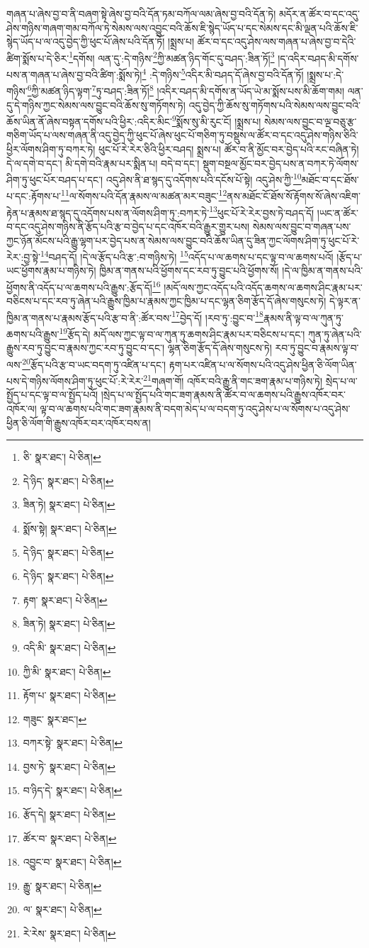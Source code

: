 གཞན་པ་ཞེས་བྱ་བ་ནི་བཞག་སྟེ་ཞེས་བྱ་བའི་དོན་ཏམ་བཀོལ་ལམ་ཞེས་བྱ་བའི་དོན་ཏེ། མདོར་ན་ཚོར་བ་དང་འདུ་ཤེས་གཉིས་གཞག་གམ་བཀོལ་ཏེ་སེམས་ལས་འབྱུང་བའི་ཆོས་ཇི་སྙེད་ཡོད་པ་དང་སེམས་དང་མི་ལྡན་པའི་ཆོས་ཇི་སྙེད་ཡོད་པ་ལ་འདུ་བྱེད་ཀྱི་ཕུང་པོ་ཞེས་པའི་དོན་ཏོ། །སྨྲས་པ། ཚོར་བ་དང་འདུ་ཤེས་ལས་གཞན་པ་ཞེས་བྱ་བ་དེའི་ཚིག་སྨོས་པ་དེ་ཅིར་\footnote{ཅི་  སྣར་ཐང་།  པེ་ཅིན། }དགོས། ལན་དུ་:དེ་གཉིས་\footnote{དེ་ཉིད་  སྣར་ཐང་།  པེ་ཅིན། }ཀྱི་མཚན་ཉིད་གོང་དུ་བཤད་:ཟིན་ཏོ།\footnote{ཟིན་ཏེ།  སྣར་ཐང་།  པེ་ཅིན། } །ད་འདིར་བཤད་མི་དགོས་པས་ན་གཞན་པ་ཞེས་བྱ་བའི་ཚིག་:སྨོས་ཏེ།\footnote{སྨོས་སྟེ།  སྣར་ཐང་།  པེ་ཅིན། } :དེ་གཉིས་\footnote{དེ་ཉིད་  སྣར་ཐང་།  པེ་ཅིན། }འདིར་མི་བཤད་དོ་ཞེས་བྱ་བའི་དོན་ཏོ། །སྨྲས་པ་:དེ་གཉིས་\footnote{དེ་ཉིད་  སྣར་ཐང་།  པེ་ཅིན། }ཀྱི་མཚན་ཉིད་ལྟག་\footnote{རྟག་  སྣར་ཐང་།  པེ་ཅིན། }ཏུ་བཤད་:ཟིན་ཏོ།\footnote{ཟིན་ཏེ།  སྣར་ཐང་།  པེ་ཅིན། } །འདིར་བཤད་མི་དགོས་ན་ཡོད་ཡེ་མ་སྨོས་པས་མི་ཆོག་གམ། ལན་དུ་དེ་གཉིས་ཀྱང་སེམས་ལས་བྱུང་བའི་ཆོས་སུ་གཏོགས་ཏེ། འདུ་བྱེད་ཀྱི་ཆོས་སུ་གཏོགས་པའི་སེམས་ལས་བྱུང་བའི་ཆོས་ཡིན་ནོ་ཞེས་བསྟན་དགོས་པའི་ཕྱིར་:འདིར་མིང་\footnote{འདི་མི་  སྣར་ཐང་།  པེ་ཅིན། }སྨོས་སུ་མི་རུང་ངོ། །སྨྲས་པ། སེམས་ལས་བྱུང་བ་ལྔ་བཅུ་རྩ་གཅིག་ཡོད་པ་ལས་གཞན་ནི་འདུ་བྱེད་ཀྱི་ཕུང་པོ་ཞེས་ཕུང་པོ་གཅིག་ཏུ་བསྡུས་ལ་ཚོར་བ་དང་འདུ་ཤེས་གཉིས་ཅིའི་ཕྱིར་ལོགས་ཤིག་ཏུ་བཀར་ཏེ། ཕུང་པོ་རེ་རེར་ཅིའི་ཕྱིར་བཤད། སྨྲས་པ། ཚོར་བ་ནི་མྱོང་བར་བྱེད་པའི་རང་བཞིན་ཏེ། དེ་ལ་དགེ་བ་དང་། མི་དགེ་བའི་རྣམ་པར་སྨིན་པ། བདེ་བ་དང་། སྡུག་བསྔལ་མྱོང་བར་བྱེད་པས་ན་བཀར་ཏེ་ལོགས་ཤིག་ཏུ་ཕུང་པོར་བཤད་པ་དང་། འདུ་ཤེས་ནི་ཐ་སྙད་དུ་འདོགས་པའི་དངོས་པོ་སྟེ། འདུ་ཤེས་ཀྱི་\footnote{ཀྱི་མི་  སྣར་ཐང་།  པེ་ཅིན། }མཐོང་བ་དང་ཐོས་པ་དང་:རྟོགས་པ་\footnote{རྟོག་པ་  སྣར་ཐང་།  པེ་ཅིན། }ལ་སོགས་པའི་དོན་རྣམས་ལ་མཚན་མར་བཟུང་\footnote{གཟུང་  སྣར་ཐང་། }ནས་མཐོང་ངོ་ཐོས་སོ་རྟོགས་སོ་ཞེས་འཇིག་རྟེན་པ་རྣམས་ཐ་སྙད་དུ་འདོགས་པས་ན་ལོགས་ཤིག་ཏུ་:བཀར་ཏེ་\footnote{བཀར་སྟེ་  སྣར་ཐང་།  པེ་ཅིན། }ཕུང་པོ་རེ་རེར་བྱས་ཏེ་བཤད་དོ། །ཡང་ན་ཚོར་བ་དང་འདུ་ཤེས་གཉིས་ནི་རྩོད་པའི་རྩ་བ་བྱེད་པ་དང་འཁོར་བའི་རྒྱུར་གྱུར་པས། སེམས་ལས་བྱུང་བ་གཞན་པས་ཀྱང་ཉོན་མོངས་པའི་རྒྱུ་ལྷག་པར་བྱེད་པས་ན་སེམས་ལས་བྱུང་བའི་ཆོས་ཡིན་དུ་ཟིན་ཀྱང་ལོགས་ཤིག་ཏུ་ཕུང་པོ་རེ་རེར་:བྱ་སྟེ་\footnote{བྱས་ཏེ་  སྣར་ཐང་།  པེ་ཅིན། }བཤད་དོ། །དེ་ལ་རྩོད་པའི་རྩ་:བ་གཉིས་ཏེ། \footnote{བ་ཉིད་དེ་  སྣར་ཐང་།  པེ་ཅིན། }འདོད་པ་ལ་ཆགས་པ་དང་ལྟ་བ་ལ་ཆགས་པའོ། །རྩོད་པ་ཡང་ཕྱོགས་རྣམ་པ་གཉིས་ཏེ། ཁྱིམ་ན་གནས་པའི་ཕྱོགས་དང་རབ་ཏུ་བྱུང་པའི་ཕྱོགས་སོ། །དེ་ལ་ཁྱིམ་ན་གནས་པའི་ཕྱོགས་ནི་འདོད་པ་ལ་ཆགས་པའི་རྒྱུས་:རྩོད་དོ།\footnote{རྩོད་དེ།  སྣར་ཐང་།  པེ་ཅིན། } །མདོ་ལས་ཀྱང་འདོད་པའི་འདོད་ཆགས་ལ་ཆགས་ཤིང་རྣམ་པར་བཅིངས་པ་དང་རབ་ཏུ་ཞེན་པའི་རྒྱུས་ཁྱིམ་པ་རྣམས་ཀྱང་ཁྱིམ་པ་དང་ལྷན་ཅིག་རྩོད་དོ་ཞེས་གསུངས་ཏེ། དེ་ལྟར་ན་ཁྱིམ་ན་གནས་པ་རྣམས་རྩོད་པའི་རྩ་བ་ནི་:ཚོར་བས་\footnote{ཚོར་བ་  སྣར་ཐང་།  པེ་ཅིན། }བྱེད་དོ། །རབ་ཏུ་:བྱུང་བ་\footnote{འབྱུང་བ་  སྣར་ཐང་།  པེ་ཅིན། }རྣམས་ནི་ལྟ་བ་ལ་ཀུན་ཏུ་ཆགས་པའི་རྒྱུས་\footnote{རྒྱུ་  སྣར་ཐང་།  པེ་ཅིན། }རྩོད་དེ། མདོ་ལས་ཀྱང་ལྟ་བ་ལ་ཀུན་ཏུ་ཆགས་ཤིང་རྣམ་པར་བཅིངས་པ་དང་། ཀུན་ཏུ་ཞེན་པའི་རྒྱུས་རབ་ཏུ་བྱུང་བ་རྣམས་ཀྱང་རབ་ཏུ་བྱུང་བ་དང་། ལྷན་ཅིག་རྩོད་དོ་ཞེས་གསུངས་ཏེ། རབ་ཏུ་བྱུང་བ་རྣམས་ལྟ་བ་ལས་\footnote{ལ་  སྣར་ཐང་།  པེ་ཅིན། }རྩོད་པའི་རྩ་བ་ཡང་བདག་ཏུ་འཛིན་པ་དང་། རྟག་པར་འཛིན་པ་ལ་སོགས་པའི་འདུ་ཤེས་ཕྱིན་ཅི་ལོག་ཡིན་པས་དེ་གཉིས་ལོགས་ཤིག་ཏུ་ཕུང་པོ་:རེ་རེར་\footnote{རེ་རེས་  སྣར་ཐང་།  པེ་ཅིན། }གཞག་གོ། འཁོར་བའི་རྒྱུ་ནི་གང་ཟག་རྣམ་པ་གཉིས་ཏེ། སྲེད་པ་ལ་སྤྱོད་པ་དང་ལྟ་བ་ལ་སྤྱོད་པའོ། །སྲེད་པ་ལ་སྤྱོད་པའི་གང་ཟག་རྣམས་ནི་ཚོར་བ་ལ་ཆགས་པའི་རྒྱུས་འཁོར་བར་འཁོར་ལ། ལྟ་བ་ལ་ཆགས་པའི་གང་ཟག་རྣམས་ནི་བདག་མེད་པ་ལ་བདག་ཏུ་འདུ་ཤེས་པ་ལ་སོགས་པ་འདུ་ཤེས་ཕྱིན་ཅི་ལོག་གི་རྒྱུས་འཁོར་བར་འཁོར་བས་ན། 